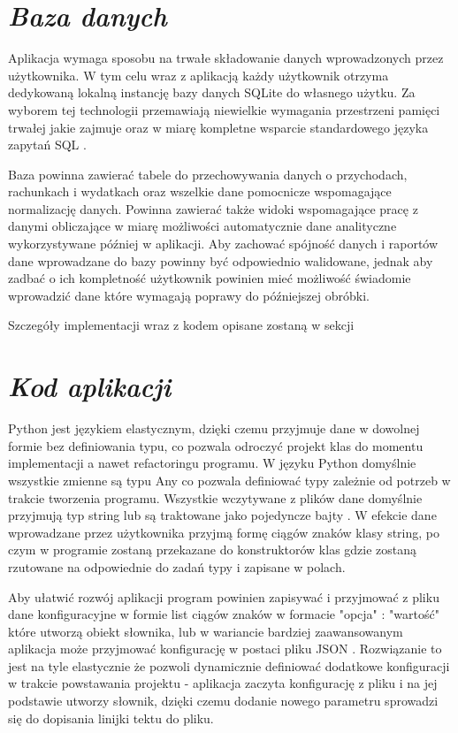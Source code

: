 \documentclass[a4paper,10pt, twoside]{report}
\newcommand{\customstylesection}[1]{\textbf{\textit{#1}}}
\begin{document}
\section{\customstylesection{Baza danych}}
{Aplikacja wymaga sposobu na trwałe składowanie danych wprowadzonych przez 
użytkownika. W tym celu wraz z aplikacją każdy użytkownik otrzyma dedykowaną 
lokalną instancję bazy danych SQLite \cite{SQLite} do własnego użytku. Za 
wyborem tej technologii przemawiają niewielkie wymagania przestrzeni pamięci 
trwałej jakie zajmuje oraz w miarę kompletne wsparcie standardowego języka 
zapytań SQL \cite{SQL}.}

{Baza powinna zawierać tabele do przechowywania danych o przychodach, rachunkach
 i wydatkach oraz wszelkie dane pomocnicze wspomagające normalizację danych. 
Powinna zawierać także widoki wspomagające pracę z danymi obliczające w miarę 
możliwości automatycznie dane analityczne wykorzystywane później w aplikacji. 
Aby zachować spójność danych i raportów dane wprowadzane do bazy powinny być 
odpowiednio walidowane, jednak aby zadbać o ich kompletność użytkownik powinien
mieć możliwość świadomie wprowadzić dane które wymagają poprawy do późniejszej 
obróbki.}

{Szczegóły implementacji wraz z kodem opisane zostaną w sekcji }

\section{\customstylesection{Kod aplikacji}}
{Python jest językiem elastycznym, dzięki czemu przyjmuje dane w dowolnej 
formie bez definiowania typu, co pozwala odroczyć projekt klas do momentu 
implementacji a nawet refactoringu programu. W języku Python \cite{Python} 
domyślnie wszystkie zmienne są typu Any co pozwala definiować typy zależnie od 
potrzeb w trakcie tworzenia programu. Wszystkie wczytywane z plików dane 
domyślnie przyjmują typ string lub są traktowane jako pojedyncze bajty 
\cite{Python_read-file}. W efekcie dane wprowadzane przez użytkownika przyjmą 
formę ciągów znaków klasy string, po czym w programie zostaną przekazane do 
konstruktorów klas gdzie zostaną rzutowane na odpowiednie do zadań typy i 
zapisane w polach.}

{Aby ułatwić rozwój aplikacji program powinien zapisywać i przyjmować z pliku 
dane konfiguracyjne w formie list ciągów znaków w formacie "opcja" : "wartość" 
które utworzą obiekt słownika, lub w wariancie bardziej zaawansowanym aplikacja 
może przyjmować konfigurację w postaci pliku JSON \cite{JSON}. Rozwiązanie to 
jest na tyle elastycznie że pozwoli dynamicznie definiować dodatkowe 
konfiguracji w trakcie powstawania projektu - aplikacja zaczyta konfigurację z 
pliku i na jej podstawie utworzy słownik, dzięki czemu dodanie nowego parametru 
sprowadzi się do dopisania linijki tektu do pliku.}
\end{document}
